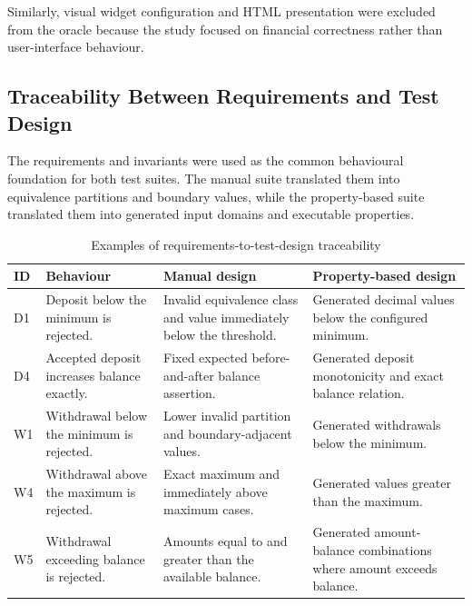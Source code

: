 \documentclass[12pt]{article}
\begin{document}
Similarly, visual widget configuration and HTML presentation were excluded
from the oracle because the study focused on financial correctness rather than
user-interface behaviour.

\subsection{Traceability Between Requirements and Test Design}

The requirements and invariants were used as the common behavioural foundation
for both test suites. The manual suite translated them into equivalence
partitions and boundary values, while the property-based suite translated them
into generated input domains and executable properties.

\begin{table}[H]
\centering
\caption{Examples of requirements-to-test-design traceability}
\label{tab:requirements-traceability}
\footnotesize

\begin{tabular}{
    |p{1.1cm}|
    p{4.1cm}|
    p{4.0cm}|
    p{4.0cm}|
}
\hline

\textbf{ID} &
\textbf{Behaviour} &
\textbf{Manual design} &
\textbf{Property-based design} \\
\hline

D1 &
Deposit below the minimum is rejected. &
Invalid equivalence class and value immediately below the threshold. &
Generated decimal values below the configured minimum. \\
\hline

D4 &
Accepted deposit increases balance exactly. &
Fixed expected before-and-after balance assertion. &
Generated deposit monotonicity and exact balance relation. \\
\hline

W1 &
Withdrawal below the minimum is rejected. &
Lower invalid partition and boundary-adjacent values. &
Generated withdrawals below the minimum. \\
\hline

W4 &
Withdrawal above the maximum is rejected. &
Exact maximum and immediately above maximum cases. &
Generated values greater than the maximum. \\
\hline

W5 &
Withdrawal exceeding balance is rejected. &
Amounts equal to and greater than the available balance. &
Generated amount-balance combinations where amount exceeds balance. \\
\hline


\end{tabular}
\end{table}
\end{document}
